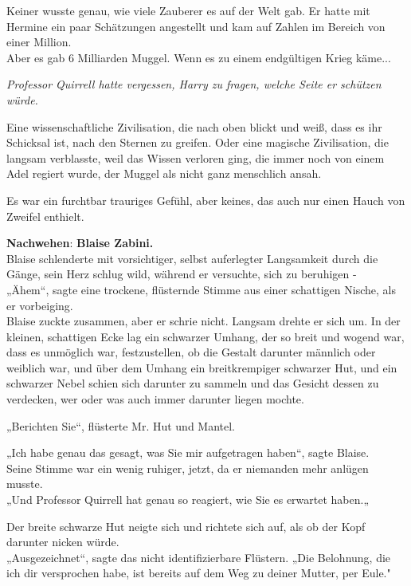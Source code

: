 {Keiner wusste genau, wie viele Zauberer es auf der Welt gab. Er hatte mit Hermine ein paar Schätzungen angestellt und kam auf Zahlen im Bereich von einer Million.\\ Aber es gab 6 Milliarden Muggel. Wenn es zu einem endgültigen Krieg käme...

\emph{Professor Quirrell hatte vergessen, Harry zu fragen, welche Seite er schützen würde.}

Eine wissenschaftliche Zivilisation, die nach oben blickt und weiß, dass es ihr Schicksal ist, nach den Sternen zu greifen. Oder eine magische Zivilisation, die langsam verblasste, weil das Wissen verloren ging, die immer noch von einem Adel regiert wurde, der Muggel als nicht ganz menschlich ansah.

Es war ein furchtbar trauriges Gefühl, aber keines, das auch nur einen Hauch von Zweifel enthielt.

\textbf{Nachwehen}: \textbf{Blaise Zabini.}\\ Blaise schlenderte mit vorsichtiger, selbst auferlegter Langsamkeit durch die Gänge, sein Herz schlug wild, während er versuchte, sich zu beruhigen -\\ „Ähem“, sagte eine trockene, flüsternde Stimme aus einer schattigen Nische, als er vorbeiging.\\ Blaise zuckte zusammen, aber er schrie nicht. Langsam drehte er sich um. In der kleinen, schattigen Ecke lag ein schwarzer Umhang, der so breit und wogend war, dass es unmöglich war, festzustellen, ob die Gestalt darunter männlich oder weiblich war, und über dem Umhang ein breitkrempiger schwarzer Hut, und ein schwarzer Nebel schien sich darunter zu sammeln und das Gesicht dessen zu verdecken, wer oder was auch immer darunter liegen mochte.

„Berichten Sie“, flüsterte Mr. Hut und Mantel.

„Ich habe genau das gesagt, was Sie mir aufgetragen haben“, sagte Blaise.\\ Seine Stimme war ein wenig ruhiger, jetzt, da er niemanden mehr anlügen musste.\\ „Und Professor Quirrell hat genau so reagiert, wie Sie es erwartet haben.„

Der breite schwarze Hut neigte sich und richtete sich auf, als ob der Kopf darunter nicken würde.\\ „Ausgezeichnet“, sagte das nicht identifizierbare Flüstern. „Die Belohnung, die ich dir versprochen habe, ist bereits auf dem Weg zu deiner Mutter, per Eule."

}
